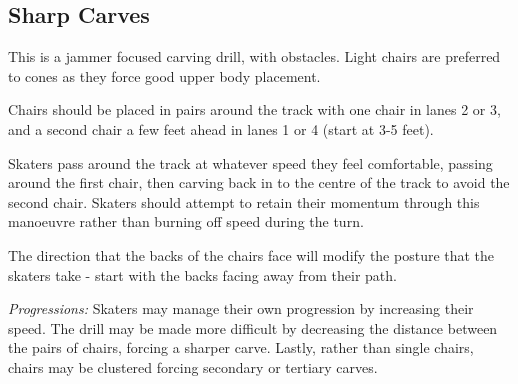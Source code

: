 \subsection*{Sharp Carves}
\label{drill:carves/sharp_chairs}

This is a jammer focused carving drill, with obstacles.
Light chairs are preferred to cones as they force good upper body placement.

Chairs should be placed in pairs around the track with one chair in lanes 2 or 3, and a second chair a few feet ahead in lanes 1 or 4 (start at 3-5 feet).

Skaters pass around the track at whatever speed they feel comfortable, passing around the first chair, then carving back in to the centre of the track to avoid the second chair.
Skaters should attempt to retain their momentum through this manoeuvre rather than burning off speed during the turn. 


The direction that the backs of the chairs face will modify the posture that the skaters take - start with the backs facing away from their path.

{\it Progressions:}
Skaters may manage their own progression by increasing their speed.
The drill may be made more difficult by decreasing the distance between the pairs of chairs, forcing a sharper carve. 
Lastly, rather than single chairs, chairs may be clustered forcing secondary or tertiary carves. 

